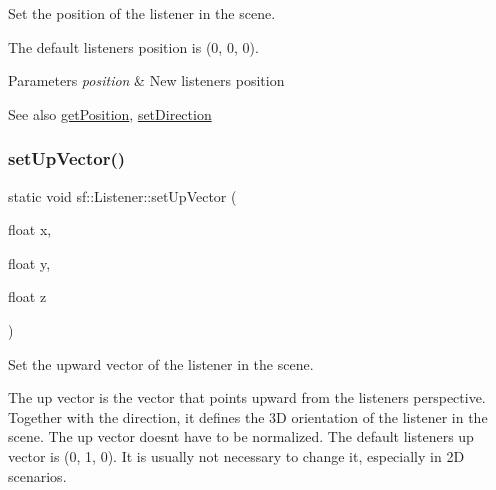 Set the position of the listener in the scene. 

The default listener\textquotesingle{}s position is (0, 0, 0).


\begin{DoxyParams}{Parameters}
{\em position} & New listener\textquotesingle{}s position\\
\hline
\end{DoxyParams}
\begin{DoxySeeAlso}{See also}
\hyperlink{classsf_1_1_listener_acd7ee65bc948ca38e1c669aa12340c54}{get\+Position}, \hyperlink{classsf_1_1_listener_ae479dc15513c6557984d26e32d06d06e}{set\+Direction} 
\end{DoxySeeAlso}
\mbox{\label{classsf_1_1_listener_a0ea9b3083a994b2b90253543bc4e3ad6}} 
\subsubsection{\texorpdfstring{set\+Up\+Vector()}{setUpVector()}\hspace{0.1cm}{\footnotesize\ttfamily [1/2]}}
{\footnotesize\ttfamily static void sf\+::\+Listener\+::set\+Up\+Vector (\begin{DoxyParamCaption}\item[{float}]{x,  }\item[{float}]{y,  }\item[{float}]{z }\end{DoxyParamCaption})\hspace{0.3cm}{\ttfamily [static]}}



Set the upward vector of the listener in the scene. 

The up vector is the vector that points upward from the listener\textquotesingle{}s perspective. Together with the direction, it defines the 3D orientation of the listener in the scene. The up vector doesn\textquotesingle{}t have to be normalized. The default listener\textquotesingle{}s up vector is (0, 1, 0). It is usually not necessary to change it, especially in 2D scenarios.


